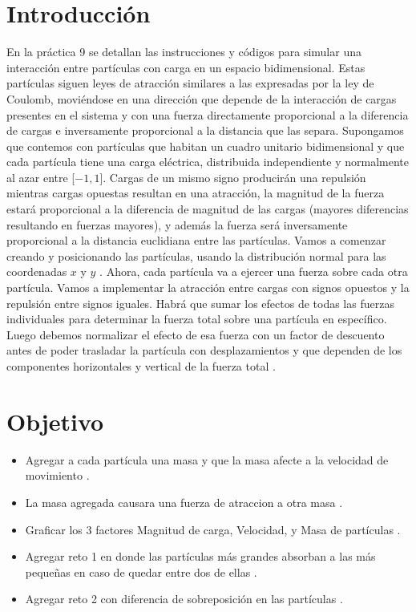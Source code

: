 \documentclass[10pt,a4paper]{article}
\begin{document}
	\vspace{5mm}

	\begin{multicols}{2}
		\section{Introducción} \label{Intro}
		En la práctica 9 se detallan las instrucciones y códigos para simular una interacción entre partículas con carga en un espacio bidimensional. Estas partículas siguen leyes de atracción similares a las expresadas por la ley de Coulomb, moviéndose en una dirección que depende de la interacción de cargas presentes en el sistema y con una fuerza directamente proporcional a la diferencia de cargas e inversamente proporcional a la distancia que las separa. Supongamos que contemos con partículas que habitan un cuadro unitario bidimensional y que cada partícula tiene una carga eléctrica, distribuida independiente y normalmente al azar entre [$-1,1$]. Cargas de un mismo signo producirán una repulsión mientras cargas opuestas resultan en una atracción, la magnitud de la fuerza estará proporcional a la diferencia de magnitud de las cargas (mayores diferencias resultando en fuerzas mayores), y además la fuerza será inversamente proporcional a la distancia euclidiana entre las partículas. Vamos a comenzar creando y posicionando las partículas, usando la distribución normal para las coordenadas 
$x$
y 
$y$
. Ahora, cada partícula va a ejercer una fuerza sobre cada otra partícula. Vamos a implementar la atracción entre cargas con signos opuestos y la repulsión entre signos iguales. Habrá que sumar los efectos de todas las fuerzas individuales para determinar la fuerza total sobre una partícula en específico. Luego debemos normalizar el efecto de esa fuerza con un factor de descuento antes de poder trasladar la partícula con desplazamientos y que dependen de los 
componentes horizontales
y vertical de la fuerza total \cite{p9}.
		\section{Objetivo} \label{antece}
		\begin{itemize}
		
		    \item Agregar a cada partícula una masa y que la masa afecte a la velocidad de movimiento \cite{p9}.
		    \item La masa agregada causara una fuerza de atraccion a otra masa \cite{p9}.
		    \item Graficar los $3$ factores Magnitud de carga, Velocidad, y Masa de partículas \cite{p9}.
		    \item Agregar reto 1 en donde las partículas más grandes absorban a las más pequeñas en caso de quedar entre dos de ellas \cite{p9}.
		    \item Agregar reto 2 con diferencia de sobreposición en las partículas \cite{p9}.
		\end{itemize}

\end{multicols}
\end{document}

